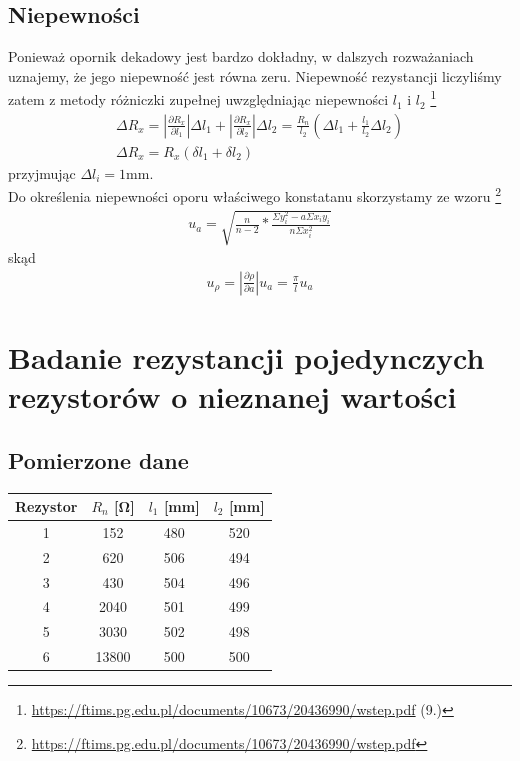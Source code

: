 \documentclass{article}
\begin{document}
\subsection{Niepewności}
Ponieważ opornik dekadowy jest bardzo dokładny, w dalszych rozważaniach uznajemy, że jego niepewność jest równa zeru.
Niepewność rezystancji liczyliśmy zatem z metody różniczki zupełnej uwzględniając niepewności $l_1$ i $l_2$ \footnote{\url{https://ftims.pg.edu.pl/documents/10673/20436990/wstep.pdf} (9.)}
\begin{gather*}
	\Delta R_x = |\frac{\partial R_x}{\partial l_1}|\Delta l_1+ |\frac{\partial R_x}{\partial l_2}|\Delta l_2 = \frac{R_n}{l_2}(\Delta l_1 + \frac{l_1}{l_2} \Delta l_2) \\
	\Delta R_x = R_x (\delta l_1+ \delta l_2)
\end{gather*}
przyjmując $\Delta l_i = 1$mm. \\
Do określenia niepewności oporu właściwego konstatanu skorzystamy ze wzoru \footnote{\url{https://ftims.pg.edu.pl/documents/10673/20436990/wstep.pdf}}\\
\begin{gather*}
		u_a = \sqrt{\frac{n}{n-2} * \frac{\Sigma y_i^2 - a\Sigma x_iy_i}{n\Sigma x_i^2}} 
\end{gather*}
skąd
\begin{gather*}
		u_\rho = |\frac{\partial \rho}{\partial a}| u_a = \frac{\pi}{l}u_a
\end{gather*}

\section{Badanie rezystancji pojedynczych rezystorów o nieznanej wartości}
\subsection{Pomierzone dane}
\begin{center}
\begin{tabular}{ c | c | c | c}
Rezystor & $R_n$ [\si{\ohm}] & $l_1$ [mm] & $l_2$ [mm]\\
\hline
 1    & 152 & 480 & 520\\ 
 2    & 620 & 506 & 494\\ 
 3  & 430 & 504 & 496\\ 
 4  & 2040 & 501 & 499\\
 5   & 3030 & 502 & 498\\
 6  & 13800 & 500 & 500\\
 
\end{tabular}
\end{center}
\end{document}
